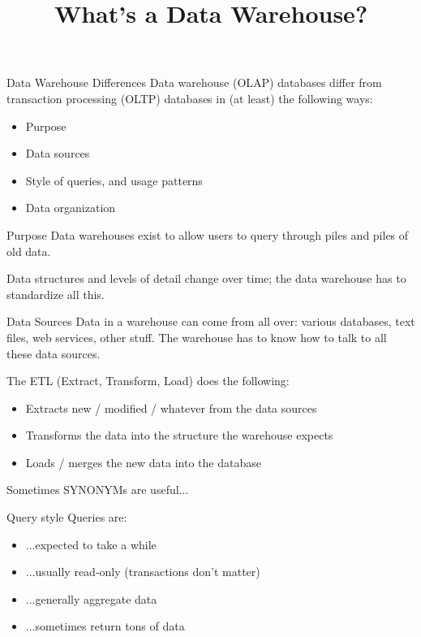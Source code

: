 \documentclass{beamer}
\begin{document}
\title{What's a Data Warehouse?}

\begin{frame}{Data Warehouse Differences}
    Data warehouse (OLAP) databases differ from transaction processing (OLTP)
    databases in (at least) the following ways:
    \begin{itemize}
        \item Purpose 
        \item Data sources 
        \item Style of queries, and usage patterns 
        \item Data organization 
    \end{itemize}
\end{frame}

\begin{frame}{Purpose}
    Data warehouses exist to allow users to query through piles and piles of
    old data.

    Data structures and levels of detail change over time; the data warehouse
    has to standardize all this.
\end{frame}

\begin{frame}{Data Sources}
    Data in a warehouse can come from all over: various databases, text files,
    web services, other stuff. The warehouse has to know how to talk to all
    these data sources.

    The ETL (Extract, Transform, Load) does the following:
    \begin{itemize}
        \item Extracts new / modified / whatever from the data sources
        \item Transforms the data into the structure the warehouse expects
        \item Loads / merges the new data into the database
    \end{itemize}

    Sometimes SYNONYMs are useful...
\end{frame}

\begin{frame}{Query style}
    Queries are:
    \begin{itemize}
        \item ...expected to take a while
        \item ...usually read-only (transactions don't matter)
        \item ...generally aggregate data
        \item ...sometimes return tons of data
    \end{itemize}
\end{frame}
\end{document}
